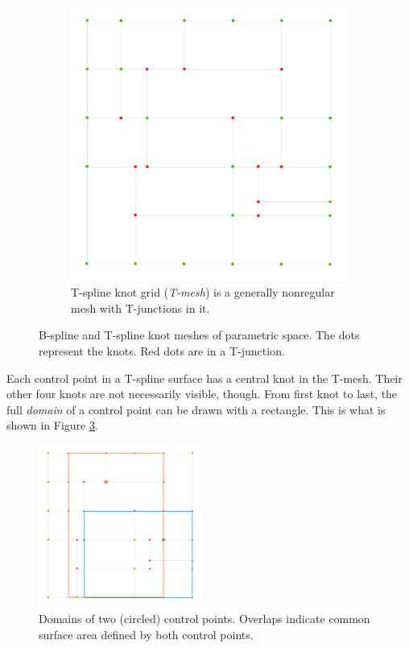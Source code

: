 \documentclass{article}
\begin{document}
\begin{figure}[H]
\begin{subfigure}[b]{0.48\textwidth}
\includegraphics[width=\textwidth]{tsplinegrid}
\caption{T-spline knot grid (\emph{T-mesh}) is a generally nonregular mesh with T-junctions in it.}
\label{tsplinegrid}
\end{subfigure}
\caption{B-spline and T-spline knot meshes of parametric space. The dots represent the knots. Red dots are in a T-junction.}
\label{knotgrids}
\end{figure}

Each control point in a T-spline surface has a central knot in the T-mesh. Their other four knots are not necessarily visible, though. From first knot to last, the full \emph{domain} of a control point can be drawn with a rectangle. This is what is shown in Figure \ref{tmeshdomains}.

\begin{figure}[H]
\centering
\includegraphics[width=0.48\textwidth]{tsplinegridoverlaps}
\caption{Domains of two (circled) control points. Overlaps indicate common surface area defined by both control points.}
\label{tmeshdomains}
\end{figure}
\end{document}
